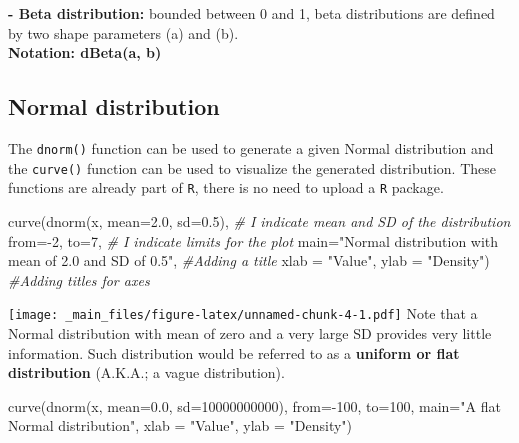 \documentclass[
]{book}
\newenvironment{Shaded}{\begin{snugshade}}{\end{snugshade}}
\newcommand{\AttributeTok}[1]{\textcolor[rgb]{0.77,0.63,0.00}{#1}}
\newcommand{\CommentTok}[1]{\textcolor[rgb]{0.56,0.35,0.01}{\textit{#1}}}
\newcommand{\DecValTok}[1]{\textcolor[rgb]{0.00,0.00,0.81}{#1}}
\newcommand{\FloatTok}[1]{\textcolor[rgb]{0.00,0.00,0.81}{#1}}
\newcommand{\FunctionTok}[1]{\textcolor[rgb]{0.00,0.00,0.00}{#1}}
\newcommand{\NormalTok}[1]{#1}
\newcommand{\SpecialCharTok}[1]{\textcolor[rgb]{0.00,0.00,0.00}{#1}}
\newcommand{\StringTok}[1]{\textcolor[rgb]{0.31,0.60,0.02}{#1}}
\begin{document}
\textbf{- Beta distribution:} bounded between 0 and 1, beta
distributions are defined by two shape parameters (a) and (b).\\
\textbf{Notation: dBeta(a, b)}

\hypertarget{normal-distribution}{%
\subsection{Normal distribution}\label{normal-distribution}}

The \texttt{dnorm()} function can be used to generate a given Normal
distribution and the \texttt{curve()} function can be used to visualize
the generated distribution. These functions are already part of
\texttt{R}, there is no need to upload a \texttt{R} package.

\begin{Shaded}
\begin{Highlighting}[]
\FunctionTok{curve}\NormalTok{(}\FunctionTok{dnorm}\NormalTok{(x, }\AttributeTok{mean=}\FloatTok{2.0}\NormalTok{, }\AttributeTok{sd=}\FloatTok{0.5}\NormalTok{),                                    }\CommentTok{\# I indicate mean and SD of the distribution}
      \AttributeTok{from=}\SpecialCharTok{{-}}\DecValTok{2}\NormalTok{, }\AttributeTok{to=}\DecValTok{7}\NormalTok{,                                                 }\CommentTok{\# I indicate limits for the plot}
      \AttributeTok{main=}\StringTok{"Normal distribution with mean of 2.0 and SD of 0.5"}\NormalTok{,     }\CommentTok{\#Adding a title}
      \AttributeTok{xlab =} \StringTok{"Value"}\NormalTok{, }\AttributeTok{ylab =} \StringTok{"Density"}\NormalTok{)                              }\CommentTok{\#Adding titles for axes}
\end{Highlighting}
\end{Shaded}

\texttt{[image: \_main\_files/figure-latex/unnamed-chunk-4-1.pdf]} Note
that a Normal distribution with mean of zero and a very large SD
provides very little information. Such distribution would be referred to
as a \textbf{uniform or flat distribution} (A.K.A.; a vague
distribution).

\begin{Shaded}
\begin{Highlighting}[]
\FunctionTok{curve}\NormalTok{(}\FunctionTok{dnorm}\NormalTok{(x, }\AttributeTok{mean=}\FloatTok{0.0}\NormalTok{, }\AttributeTok{sd=}\DecValTok{10000000000}\NormalTok{),                                    }
      \AttributeTok{from=}\SpecialCharTok{{-}}\DecValTok{100}\NormalTok{, }\AttributeTok{to=}\DecValTok{100}\NormalTok{,                                                 }
      \AttributeTok{main=}\StringTok{"A flat Normal distribution"}\NormalTok{,     }
      \AttributeTok{xlab =} \StringTok{"Value"}\NormalTok{, }\AttributeTok{ylab =} \StringTok{"Density"}\NormalTok{)                              }
\end{Highlighting}
\end{Shaded}
\end{document}

